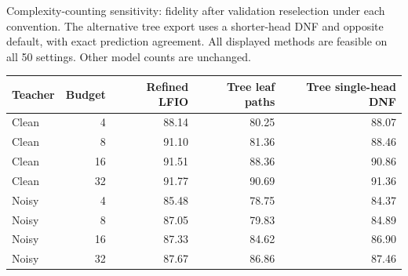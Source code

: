 \begin{kbtable}
\centering
\caption{Complexity-counting sensitivity: fidelity after validation reselection under each convention. The alternative tree export uses a shorter-head DNF and opposite default, with exact prediction agreement. All displayed methods are feasible on all 50 settings. Other model counts are unchanged.}
\label{tab:strength_counting}
\small
\begin{adjustbox}{max width=\linewidth}
\begin{tabular}{lrrrr}
\toprule
Teacher & Budget & Refined LFIO & Tree leaf paths & Tree single-head DNF \\
\midrule
Clean & 4 & 88.14 & 80.25 & 88.07 \\
Clean & 8 & 91.10 & 81.36 & 88.46 \\
Clean & 16 & 91.51 & 88.36 & 90.86 \\
Clean & 32 & 91.77 & 90.69 & 91.36 \\
Noisy & 4 & 85.48 & 78.75 & 84.37 \\
Noisy & 8 & 87.05 & 79.83 & 84.89 \\
Noisy & 16 & 87.33 & 84.62 & 86.90 \\
Noisy & 32 & 87.67 & 86.86 & 87.46 \\
\bottomrule
\end{tabular}
\end{adjustbox}
\end{kbtable}
